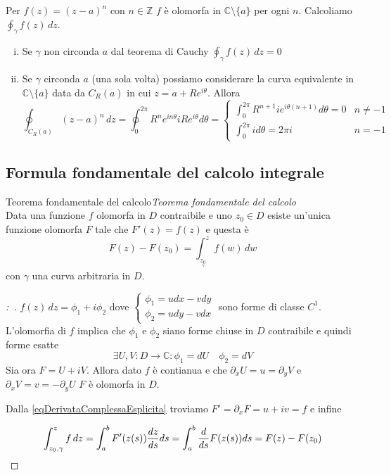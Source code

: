 \documentclass[11pt,a4paper,twoside]{book}
\newenvironment{teorema}[1][\empty]{\begin{Teorema}{
\ifx\empty#1\relax\else\mdseries\itshape#1\\\fi
}{}}{\end{Teorema}}
\newenvironment{esempio}[1][Esempio]{ 
  \begin{center}\begin{tcolorbox}[
  title={#1:~},
  width=0.9\linewidth,
  flush right,
  enhanced jigsaw, 
  colback=white, 
  frame hidden, 
  sharpish corners, arc=3mm,
  borderline west = {1pt}{0pt}{gray},
  borderline south = {1pt}{0pt}{gray},
  coltitle=black, 
  fonttitle=\small\bfseries, 
  attach title to upper, 
  breakable,
  top=2.5pt, bottom=0.3pt]\small
  }{
 \normalsize \end{tcolorbox}\end{center}
}
\newenvironment{dimo}[1][\proofname]{
	\begin{tcolorbox}[
	breakable, 
	enhanced, 
	interior hidden, 
	frame hidden, 
	borderline west = {1pt}{0pt}{gray}, 
	top=0pt, bottom=0pt, left=0pt]
\begin{proof}[#1:~]
}
{
\end{proof}
\end{tcolorbox}
}
\theoremstyle{esss}
\theoremstyle{dotless}
\numberwithin{equation}{section} %
\begin{document}
\begin{esempio}
Per $f(z)=(z-a)^n$ con $n\in\mathbb{Z}$ $f$ è olomorfa in $\mathbb{C}\setminus\{a\}$ per ogni $n$. Calcoliamo $\oint_{\gamma}f(z)\,dz$. \begin{enumerate}[i.]
\item Se $\gamma$ non circonda $a$ dal teorema di Cauchy $\oint_{\gamma}f(z)\,dz=0$
\item Se $\gamma$ circonda $a$ (una sola volta) possiamo considerare la curva equivalente in $\mathbb{C}\setminus\{a\}$ data da $C_R(a)$ in cui $z=a+Re^{i\theta}$. Allora
\[
\oint_{C_R(a)}(z-a)^n \, dz= \oint_0^{2\pi} R^n e^{in\theta} iRe^{i\theta} d\theta=\begin{cases} \int_0^{2\pi} R^{n+1}i e^{i\theta(n+1)} d\theta=0 & n\neq -1 \\ \int_0^{2\pi} i d\theta =2\pi i & n=-1 \end{cases}
\]
\end{enumerate}
\end{esempio}

\subsection{Formula fondamentale del calcolo integrale}

\begin{teorema}[Teorema fondamentale del calcolo]
Data una funzione $f$ olomorfa in $D$ contraibile e uno $z_0\in D$ esiste un'unica funzione olomorfa $F$ tale che $F'(z)=f(z)$ e questa è
\[
F(z)-F(z_0)=\int_{\underset{\gamma}{z_0}}^z f(w) \, dw
\]
con $\gamma$ una curva arbitraria in $D$.
\end{teorema}

\begin{dimo}
$f(z) \,dz=\phi_1+i\phi_2$ dove $\begin{cases} \phi_1=udx-vdy \\ \phi_2=udy-vdx\end{cases}$ sono forme di classe $C^1$. 
L'olomorfia di $f$ implica che $\phi_1$ e $\phi_2$ siano forme chiuse in $D$ contraibile e quindi forme esatte
\[
\exists U,V:D\rightarrow\mathbb{C} : \phi_1=dU \quad \phi_2=dV
\]
Sia ora $F=U+iV$. Allora dato $f$ è contianua e che $\partial_x U=u=\partial_y V$ e $ \partial_x V=v=-\partial_y U$ $F$ è olomorfa in $D$.

Dalla \eqref{eqDerivataComplessaEsplicita} troviamo $F'=\partial_x F= u+iv=f$ e infine 

\[
\int_{z_0,\gamma}^z f\, dz=\int_a^b F'(z(s)) \dfrac{dz}{ds} ds = \int_a^b \dfrac{d}{ds} F(z(s))ds=F(z)-F(z_0) \qedhere
\]

\end{dimo}
\end{document}
